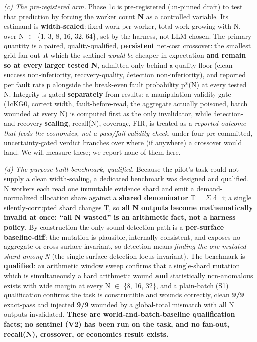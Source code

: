 \documentclass[acmsmall,screen,review,anonymous]{acmart}
\renewenvironment{leftbar}{%
  \def\FrameCommand{\hspace{2pt}{\color{lbcol}\vrule width 1.5pt}\hspace{8pt}}%
  \MakeFramed{\advance\hsize-\width \FrameRestore}\small}%
  {\endMakeFramed}
\begin{document}
\begin{leftbar}
\emph{(c) The pre-registered arm.} Phase 1c is pre-registered (un-pinned draft) to test that prediction by forcing the worker count \textbf{N} as a controlled variable. Its estimand is \textbf{width-scaled}: fixed work per worker, total work growing with N, over N $\in$ \{1, 3, 8, 16, 32, 64\}, set by the harness, not LLM-chosen. The primary quantity is a paired, quality-qualified, \textbf{persistent} net-cost crossover: the smallest grid fan-out at which the sentinel \emph{would be} cheaper in expectation \textbf{and remain so at every larger tested N}, admitted only behind a quality floor (clean-success non-inferiority, recovery-quality, detection non-inferiority), and reported per fault rate p alongside the break-even fault probability p*(N) at every tested N. Integrity is gated \textbf{separately} from results: a manipulation-validity gate (1cKG0, correct width, fault-before-read, the aggregate actually poisoned, batch wounded at every N) is computed first as the only invalidator, while detection-and-recovery \textbf{scaling}, recall(N), coverage, FIR, is treated as a \emph{reported outcome that feeds the economics, not a pass/fail validity check}, under four pre-committed, uncertainty-gated verdict branches over where (if anywhere) a crossover would land. We will measure these; we report none of them here.

\emph{(d) The purpose-built benchmark, qualified.} Because the pilot's task could not supply a clean width-scaling, a dedicated benchmark was designed and qualified. N workers each read one immutable evidence shard and emit a demand-normalized allocation share against a \textbf{shared denominator} T = $\Sigma$ d\_i; a single silently-corrupted shard changes T, so \textbf{all N outputs become mathematically invalid at once: ``all N wasted'' is an arithmetic fact, not a harness policy}. By construction the only sound detection path is a \textbf{per-surface baseline-diff}: the mutation is plausible, internally consistent, and exposes no aggregate or cross-surface invariant, so detection means \emph{finding the one mutated shard among N} (the single-surface detection-locus invariant). The benchmark is \textbf{qualified}: an arithmetic window sweep confirms that a single-shard mutation which is simultaneously a hard arithmetic wound \textbf{and} statistically non-anomalous exists with wide margin at every N $\in$ \{8, 16, 32\}, and a plain-batch (S1) qualification confirms the task is constructible and wounds correctly, clean \textbf{9/9} exact-pass and injected \textbf{9/9} wounded by a global-total mismatch with all N outputs invalidated. \textbf{These are world-and-batch-baseline qualification facts; no sentinel (V2) has been run on the task, and no fan-out, recall(N), crossover, or economics result exists.}


\end{leftbar}
\end{document}
